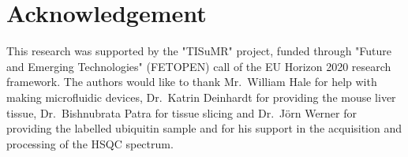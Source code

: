 \documentclass[preprint,5p]{elsarticle}
\begin{document}
\section{Acknowledgement}
This research was supported by the "TISuMR" project,
funded through "Future and Emerging Technologies" (FETOPEN)
call of the EU Horizon 2020 research framework. The authors would like to
thank Mr.~William Hale for help with
making microfluidic devices, Dr.~Katrin Deinhardt for providing
the mouse liver tissue, Dr.~Bishnubrata Patra for tissue slicing and Dr.~J\"{o}rn Werner for providing the
labelled ubiquitin sample and for his support in the acquisition
and processing of the HSQC spectrum.
\clearpage


\end{document}
